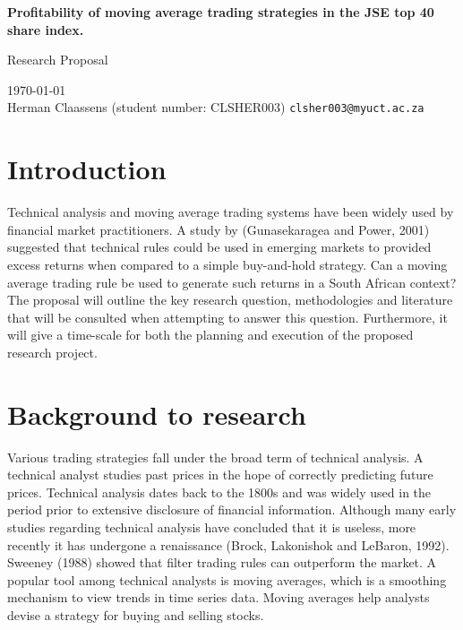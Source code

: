 \documentclass[12pt]{article}
\begin{document}
\begin{titlepage}

\begin{center}
{\Huge \bf Profitability of moving average trading strategies in the JSE top 40 share index. \vspace{1cm}

\Large Research Proposal} \vspace{1cm}

\today\\
Herman Claassens (student number: CLSHER003)
{\tt clsher003@myuct.ac.za}

\end{center}
\end{titlepage}

\tableofcontents
\newpage

\section{Introduction}
Technical analysis and moving average trading systems have been widely used by financial market practitioners. A study by (Gunasekaragea and Power, 2001) suggested that technical rules could be used in emerging markets to provided excess returns when compared to a simple buy-and-hold strategy. Can a moving average trading rule be used to generate such returns in a South African context? The proposal will outline the key research question, methodologies and literature that will be consulted when attempting to answer this question. Furthermore, it will give a  time-scale for both the planning and execution of the proposed research project. 


\section{Background to research}
\label{sec:background}

Various trading strategies fall under the broad term of technical analysis. A technical analyst studies past prices in the hope of correctly predicting future prices. Technical analysis dates back to the 1800s and was widely used in the period prior to extensive disclosure of financial information. Although many early studies regarding technical analysis have concluded that it is useless, more recently it has undergone a renaissance (Brock, Lakonishok and LeBaron, 1992). Sweeney (1988) showed that filter trading rules can outperform the market. A popular tool among technical analysts is moving averages, which is a smoothing mechanism to view trends in time series data. Moving averages help analysts devise a strategy for buying and selling stocks. 
\end{document}
